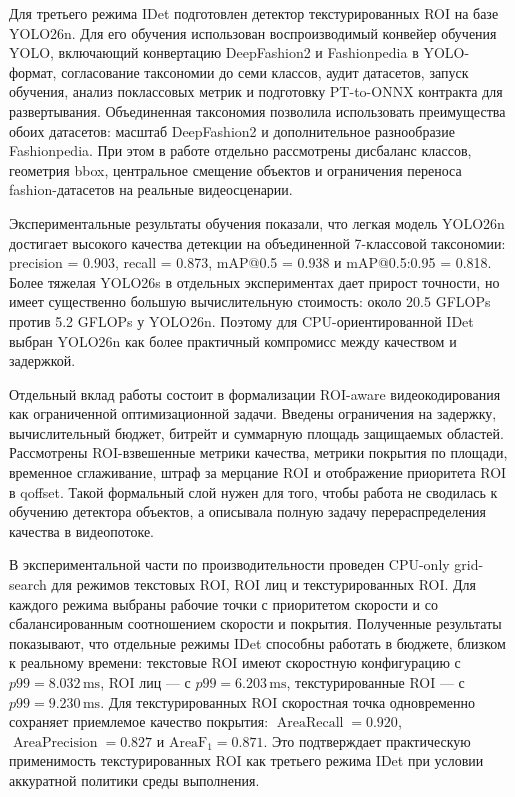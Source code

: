 \documentclass[12pt,a4paper,oneside,openany]{report}
\newcommand{\ms}{\mathrm{ms}}
\begin{document}
Для третьего режима IDet подготовлен детектор текстурированных ROI на базе YOLO26n. Для его обучения использован воспроизводимый конвейер обучения YOLO, включающий конвертацию DeepFashion2 и Fashionpedia в YOLO-формат, согласование таксономии до семи классов, аудит датасетов, запуск обучения, анализ поклассовых метрик и подготовку PT-to-ONNX контракта для развертывания. Объединенная таксономия позволила использовать преимущества обоих датасетов: масштаб DeepFashion2 и дополнительное разнообразие Fashionpedia. При этом в работе отдельно рассмотрены дисбаланс классов, геометрия bbox, центральное смещение объектов и ограничения переноса fashion-датасетов на реальные видеосценарии.

Экспериментальные результаты обучения показали, что легкая модель YOLO26n достигает высокого качества детекции на объединенной 7-классовой таксономии: precision = 0.903, recall = 0.873, mAP@0.5 = 0.938 и mAP@0.5:0.95 = 0.818. Более тяжелая YOLO26s в отдельных экспериментах дает прирост точности, но имеет существенно большую вычислительную стоимость: около 20.5 GFLOPs против 5.2 GFLOPs у YOLO26n. Поэтому для CPU-ориентированной IDet выбран YOLO26n как более практичный компромисс между качеством и задержкой.

Отдельный вклад работы состоит в формализации ROI-aware видеокодирования как ограниченной оптимизационной задачи. Введены ограничения на задержку, вычислительный бюджет, битрейт и суммарную площадь защищаемых областей. Рассмотрены ROI-взвешенные метрики качества, метрики покрытия по площади, временное сглаживание, штраф за мерцание ROI и отображение приоритета ROI в qoffset. Такой формальный слой нужен для того, чтобы работа не сводилась к обучению детектора объектов, а описывала полную задачу перераспределения качества в видеопотоке.

В экспериментальной части по производительности проведен CPU-only grid-search для режимов текстовых ROI, ROI лиц и текстурированных ROI. Для каждого режима выбраны рабочие точки с приоритетом скорости и со сбалансированным соотношением скорости и покрытия. Полученные результаты показывают, что отдельные режимы IDet способны работать в бюджете, близком к реальному времени: текстовые ROI имеют скоростную конфигурацию с $p99=8.032\,\ms$, ROI лиц --- с $p99=6.203\,\ms$, текстурированные ROI --- с $p99=9.230\,\ms$. Для текстурированных ROI скоростная точка одновременно сохраняет приемлемое качество покрытия: $\operatorname{AreaRecall}=0.920$, $\operatorname{AreaPrecision}=0.827$ и $\operatorname{AreaF_1}=0.871$. Это подтверждает практическую применимость текстурированных ROI как третьего режима IDet при условии аккуратной политики среды выполнения.
\end{document}
